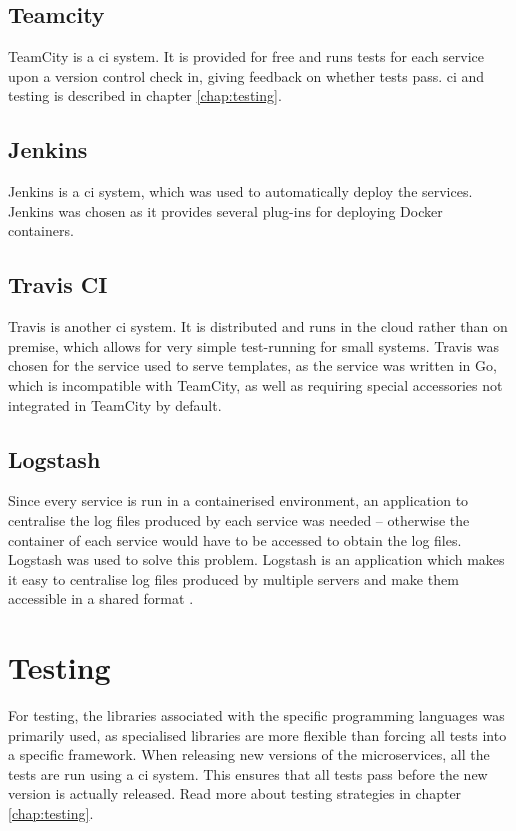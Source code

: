 \subsection{Teamcity}\label{subsec:technologies-teamcity}
TeamCity is a \acrshort{ci} system. It is provided for free and runs tests for each service upon a version control check in, giving feedback on whether tests pass. \acrshort{ci} and testing is described in chapter \ref{chap:testing}.

\subsection{Jenkins}
Jenkins is a \acrshort{ci} system, which was used to automatically deploy the services. Jenkins was chosen as it provides several plug-ins for deploying Docker containers.

\subsection{Travis CI}\label{subsec:technologies-travis}
Travis is another \acrshort{ci} system. It is distributed and runs in the cloud rather than on premise, which allows for very simple test-running for small systems. Travis was chosen for the service used to serve templates, as the service was written in Go, which is incompatible with TeamCity, as well as requiring special accessories not integrated in TeamCity by default.

\subsection{Logstash}
Since every service is run in a containerised environment, an application to centralise the log files produced by each service was needed -- otherwise the container of each service would have to be accessed to obtain the log files. Logstash was used to solve this problem. Logstash is an application which makes it easy to centralise log files produced by multiple servers and make them accessible in a shared format \citep{logstash}.

\section{Testing} \label{section:tools_tech_testing}
For testing, the libraries associated with the specific programming languages was primarily used, as specialised libraries are more flexible than forcing all tests into a specific framework. When releasing new versions of the microservices, all the tests are run using a \acrshort{ci} system. This ensures that all tests pass before the new version is actually released. Read more about testing strategies in chapter \ref{chap:testing}.

